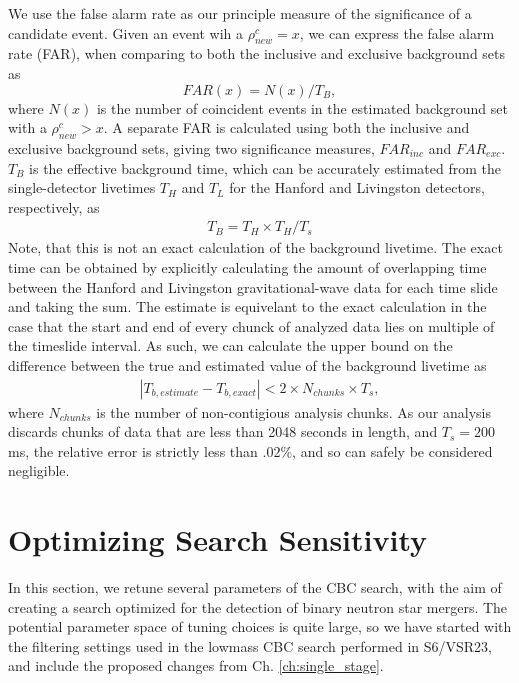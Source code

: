 We use the false alarm rate as our principle measure of the significance of a candidate event. Given an event wih a $\rho^c_{new}=x$, we can express the false alarm rate (FAR), when comparing to both the inclusive and exclusive background sets as
%
\begin{equation}
FAR (x) = N (x) / {T_B},
\end{equation}
%
where $N(x)$ is the number of coincident events in the estimated background set with a $\rho^c_{new} > x$. A separate FAR is calculated using both the inclusive and exclusive background sets, giving two significance measures, $FAR_{inc}$ and $FAR_{exc}$. $T_B$ is the effective background time, which can be accurately estimated from the single-detector livetimes $T_H$ and $T_L$ for the Hanford and Livingston detectors, respectively, as
%
\begin{eqnarray}
T_B =  T_H \times T_H / T_s
\end{eqnarray}
%
Note, that this is not an exact calculation of the background livetime. The exact time can be obtained by explicitly calculating the amount of overlapping time between the Hanford and Livingston gravitational-wave data for each time slide and taking the sum. The estimate is equivelant to the exact calculation in the case that the start and end of every chunck of analyzed data lies on multiple of the timeslide interval. As such, we can calculate the upper bound on the difference between the true and estimated value of the background livetime as
%
\begin{eqnarray}
|T_{b, estimate} - T_{b, exact} |< 2 \times N_{chunks} \times T_s,
\end{eqnarray}
%
where $N_{chunks}$ is the number of non-contigious analysis chunks. As our analysis discards chunks of data that are less than 2048 seconds in length, and  $T_s=200$ ms, the relative error is strictly less than $.02\%$, and so can safely be considered negligible.

\section{Optimizing Search Sensitivity}
\label{sec:tuning}

In this section, we retune several parameters of the CBC search, with the aim of creating a search optimized for the detection of binary neutron star mergers. The potential parameter space of tuning choices is quite large, so we have started with the filtering settings used in the lowmass CBC search performed in S6/VSR23, and include the proposed changes from Ch. \ref{ch:single_stage}. 


